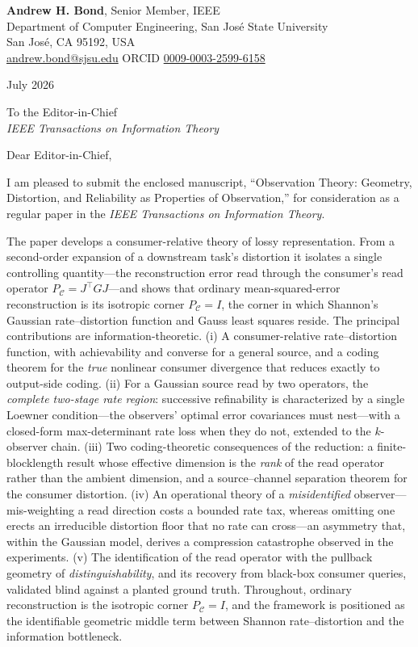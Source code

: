 \documentclass[11pt]{article}
\begin{document}
\noindent\textbf{Andrew H. Bond}, Senior Member, IEEE\\
Department of Computer Engineering, San Jos\'e State University\\
San Jos\'e, CA 95192, USA\\
\href{mailto:andrew.bond@sjsu.edu}{andrew.bond@sjsu.edu} \quad ORCID
\href{https://orcid.org/0009-0003-2599-6158}{0009-0003-2599-6158}

\medskip
\noindent July 2026

\bigskip
\noindent To the Editor-in-Chief\\
\emph{IEEE Transactions on Information Theory}

\bigskip
\noindent Dear Editor-in-Chief,

\medskip
I am pleased to submit the enclosed manuscript, ``Observation Theory: Geometry,
Distortion, and Reliability as Properties of Observation,'' for consideration as a
regular paper in the \emph{IEEE Transactions on Information Theory}.

The paper develops a consumer-relative theory of lossy representation. From a
second-order expansion of a downstream task's distortion it isolates a single
controlling quantity---the reconstruction error read through the consumer's read
operator $P_{\mathcal{C}}=J^\top G J$---and shows that ordinary mean-squared-error
reconstruction is its isotropic corner $P_{\mathcal{C}}=I$, the corner in which
Shannon's Gaussian rate--distortion function and Gauss least squares reside. The
principal contributions are information-theoretic. (i) A consumer-relative
rate--distortion function, with achievability and converse for a general source, and a
coding theorem for the \emph{true} nonlinear consumer divergence that reduces exactly to
output-side coding. (ii) For a Gaussian source read by two operators, the \emph{complete
two-stage rate region}: successive refinability is characterized by a single Loewner
condition---the observers' optimal error covariances must nest---with a closed-form
max-determinant rate loss when they do not, extended to the $k$-observer chain. (iii) Two
coding-theoretic consequences of the reduction: a finite-blocklength result whose effective
dimension is the \emph{rank} of the read operator rather than the ambient dimension, and a
source--channel separation theorem for the consumer distortion. (iv) An operational theory
of a \emph{misidentified} observer---mis-weighting a read direction costs a bounded rate
tax, whereas omitting one erects an irreducible distortion floor that no rate can cross---an
asymmetry that, within the Gaussian model, derives a compression catastrophe observed in
the experiments. (v) The identification of the read operator with the pullback geometry of
\emph{distinguishability}, and its recovery from black-box consumer queries, validated blind
against a planted ground truth. Throughout, ordinary reconstruction is the isotropic corner
$P_{\mathcal{C}}=I$, and the framework is positioned as the identifiable geometric middle
term between Shannon rate--distortion and the information bottleneck.
\end{document}
